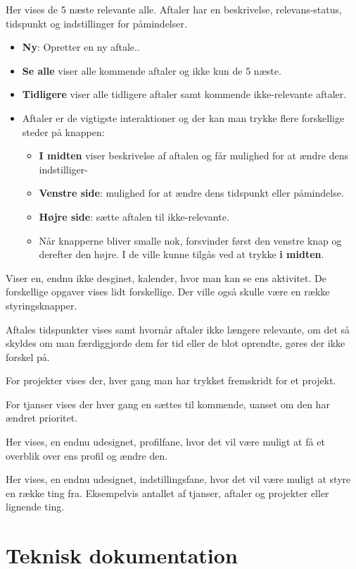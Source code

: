 \documentclass{report}
\begin{document}
Her vises de 5 næste relevante alle. Aftaler har en beskrivelse, relevans-status, tidspunkt og indstillinger for påmindelser.
\begin{itemize}
\item \textbf{Ny}: Opretter en ny aftale..
\item \textbf{Se alle} viser alle kommende aftaler og ikke kun de 5 næste.
\item \textbf{Tidligere} viser alle tidligere aftaler samt kommende ikke-relevante aftaler.
\item Aftaler er de vigtigste interaktioner og der kan man trykke flere forskellige steder på knappen:
\begin{itemize}
\item \textbf{I midten} viser beskrivelse af aftalen og får mulighed for at ændre dens indstilliger-
\item \textbf{Venstre side}: mulighed for at ændre dens tidspunkt eller påmindelse.
\item \textbf{Højre side}: sætte aftalen til ikke-relevante.
\item Når knapperne bliver smalle nok, forsvinder først den venstre knap og derefter den højre. I de ville kunne tilgås ved at trykke \textbf{i midten}.
\end{itemize}
\end{itemize}

Viser en, endnu ikke desginet, kalender, hvor man kan se ens aktivitet. De forskellige opgaver vises lidt forskellige. Der ville også skulle være en række styringsknapper.\par{}
Aftales tidspunkter vises samt hvornår aftaler ikke længere relevante, om det så skyldes om man færdiggjorde dem før tid eller de blot oprendte, gøres der ikke forskel på.\par{}
For projekter vises der, hver gang man har trykket fremskridt for et projekt.\par{}
For tjanser vises der hver gang en sættes til kommende, uanset om den har ændret prioritet.

Her vises, en endnu udesignet, profilfane, hvor det vil være muligt at få et overblik over ens profil og ændre den.

Her vises, en endnu udesignet, indstillingsfane, hvor det vil være muligt at styre en række ting fra. Eksempelvis antallet af tjanser, aftaler og projekter eller lignende ting.

\chapter{Teknisk dokumentation}
\end{document}
